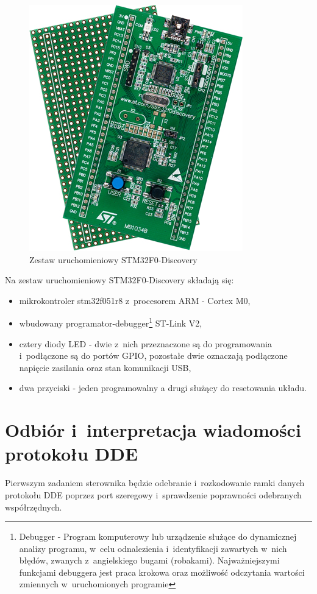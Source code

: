 \documentclass[eng,oneside]{mgr}
\begin{document}
	\begin{figure}[!htb]
		\begin{center}
			\includegraphics[scale=0.56]{stm32f0discovery}
		\end{center}
		\caption{Zestaw uruchomieniowy STM32F0-Discovery}
		\label{fig:discovery_eval_board}
	\end{figure}

	\clearpage
	Na zestaw uruchomieniowy STM32F0-Discovery składają się:
	\begin{itemize}
		\item mikrokontroler stm32f051r8 z~procesorem ARM - Cortex M0,
		\item wbudowany programator-debugger\footnote{Debugger - Program komputerowy lub urządzenie służące do dynamicznej analizy programu, w~celu odnalezienia i~identyfikacji zawartych w~nich błędów, zwanych z~angielskiego bugami (robakami). Najważniejszymi funkcjami debuggera jest praca krokowa oraz możliwość odczytania wartości zmiennych w~uruchomionych programie} ST-Link V2,
		\item cztery diody LED - dwie z~nich przeznaczone są do programowania i~podłączone są do portów GPIO, pozostałe dwie oznaczają podłączone napięcie zasilania oraz stan komunikacji USB,
		\item dwa przyciski - jeden programowalny a drugi służący do resetowania układu.
	\end{itemize}

		\section{Odbiór i~interpretacja wiadomości protokołu DDE}
		Pierwszym zadaniem sterownika będzie odebranie i~rozkodowanie ramki danych protokołu DDE poprzez port szeregowy i~sprawdzenie poprawności odebranych współrzędnych. 
\end{document}
